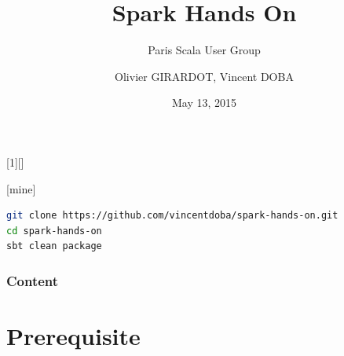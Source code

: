 \documentclass[slidetop,9pt,utf8]{beamer}
\begin{document}
\AtBeginSection{\frame{\sectionpage}}

[1][]{%
}

[mine]

%
%
%
%


\title[Spark Hands On (PSUG)]{Spark Hands On}
\subtitle{Paris Scala User Group}
\author{Olivier GIRARDOT, Vincent DOBA}
\date{May 13, 2015}

\begin{frame}[fragile]

    \begin{lstlisting}[language=bash, basicstyle=\small\ttfamily]
git clone https://github.com/vincentdoba/spark-hands-on.git
cd spark-hands-on
sbt clean package 
    \end{lstlisting}

\end{frame}

\frame{\titlepage}


\begin{frame}[allowframebreaks]
  \frametitle{Content}
  \tableofcontents[hideallsubsections]
\end{frame}

\section{Prerequisite}
\end{document}
